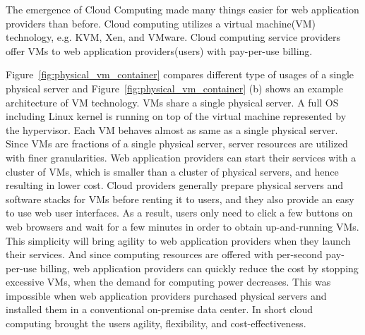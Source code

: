 The emergence of Cloud Computing made many things easier for web application providers than before.
Cloud computing utilizes a virtual machine(VM) technology, e.g. KVM, Xen, and VMware.
Cloud computing service providers offer VMs to web application providers(users) with pay-per-use billing.

Figure~\ref{fig:physical_vm_container} compares different type of usages of a single physical server and Figure~\ref{fig:physical_vm_container} (b) shows an example architecture of VM technology.
VMs share a single physical server.
A full OS including Linux kernel is running on top of the virtual machine represented by the hypervisor.
Each VM behaves almost as same as a single physical server.
Since VMs are fractions of a single physical server, server resources are utilized with finer granularities.
Web application providers can start their services with a cluster of VMs, which is smaller than a cluster of physical servers, and hence resulting in lower cost.
Cloud providers generally prepare physical servers and software stacks for VMs before renting it to users, and they also provide an easy to use web user interfaces.
As a result, users only need to click a few buttons on web browsers and wait for a few minutes in order to obtain up-and-running VMs.
This simplicity will bring agility to web application providers when they launch their services.
And since computing resources are offered with per-second pay-per-use billing, web application providers can quickly reduce the cost by stopping excessive VMs, when the demand for computing power decreases.
This was impossible when web application providers purchased physical servers and installed them in a conventional on-premise data center.
In short cloud computing brought the users agility, flexibility, and cost-effectiveness.

